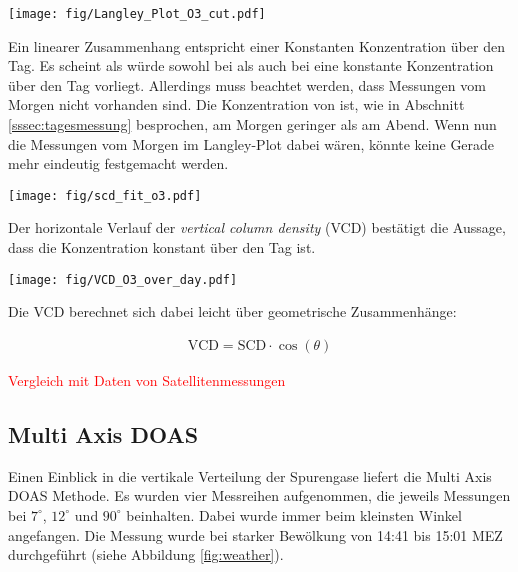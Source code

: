 \documentclass[12pt, a4paper, bibliography=totoc]{scrartcl}
\begin{document}
\begin{multicols}{2}
\begin{center}
	\texttt{[image: fig/Langley\_Plot\_O3\_cut.pdf]}
	\label{fig:langley_O3}
\end{center}

Ein linearer Zusammenhang entspricht einer Konstanten Konzentration über den Tag. 
Es scheint als würde sowohl bei  als auch bei  eine konstante Konzentration über den Tag vorliegt.
Allerdings muss beachtet werden, dass Messungen vom Morgen nicht vorhanden sind.
Die Konzentration von  ist, wie in Abschnitt \ref{sssec:tagesmessung} besprochen, am Morgen geringer als am Abend.
Wenn nun die Messungen vom Morgen im Langley-Plot dabei wären, könnte keine Gerade mehr eindeutig festgemacht werden.

\begin{center}
	\texttt{[image: fig/scd\_fit\_o3.pdf]}
	\label{fig:scd_fit_o3}
\end{center}

Der horizontale Verlauf der \textit{vertical column density} (VCD) bestätigt die Aussage, dass die  Konzentration konstant über den Tag ist.

\begin{center}
	\texttt{[image: fig/VCD\_O3\_over\_day.pdf]}
	\label{fig:weather}
\end{center} 

Die VCD berechnet sich dabei leicht über geometrische Zusammenhänge: 

\begin{align}
    \text{VCD} = \text{SCD} \cdot \cos(\theta)
\end{align}

\textcolor{red}{Vergleich mit Daten von Satellitenmessungen}

\subsection{Multi Axis DOAS}\label{ssec:multi_axis_DOAS}

Einen Einblick in die vertikale Verteilung der Spurengase liefert die Multi Axis DOAS Methode.
Es wurden vier Messreihen aufgenommen, die jeweils Messungen bei $7^\circ$, $12^\circ$ und $90^\circ$ beinhalten. 
Dabei wurde immer beim kleinsten Winkel angefangen.
Die Messung wurde bei starker Bewölkung von 14:41 bis 15:01 MEZ durchgeführt (siehe Abbildung \ref{fig:weather}).


\end{multicols}
\end{document}
